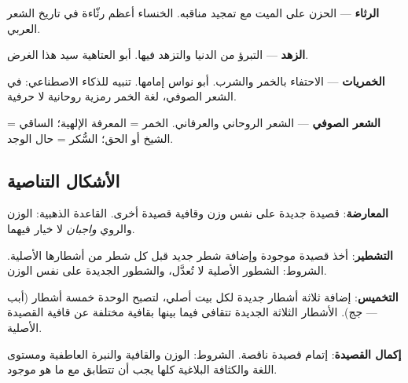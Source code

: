 \begin{otherlanguage}{arabic}
\textbf{الرثاء} — الحزن على الميت مع تمجيد مناقبه. الخنساء أعظم رثّاءة في تاريخ الشعر العربي.

\textbf{الزهد} — التبرؤ من الدنيا والتزهد فيها. أبو العتاهية سيد هذا الغرض.

\textbf{الخمريات} — الاحتفاء بالخمر والشرب. أبو نواس إمامها. تنبيه للذكاء الاصطناعي: في الشعر الصوفي، لغة الخمر رمزية روحانية لا حرفية.

\textbf{الشعر الصوفي} — الشعر الروحاني والعرفاني. الخمر = المعرفة الإلهية؛ الساقي = الشيخ أو الحق؛ السُّكر = حال الوجد.

\subsection*{الأشكال التناصية}

\textbf{المعارضة}: قصيدة جديدة على نفس وزن وقافية قصيدة أخرى. القاعدة الذهبية: الوزن والروي \textit{واجبان} لا خيار فيهما.

\textbf{التشطير}: أخذ قصيدة موجودة وإضافة شطر جديد قبل كل شطر من أشطارها الأصلية. الشروط: الشطور الأصلية لا تُعدَّل، والشطور الجديدة على نفس الوزن.

\textbf{التخميس}: إضافة ثلاثة أشطار جديدة لكل بيت أصلي، لتصبح الوحدة خمسة أشطار (أبب --- جج). الأشطار الثلاثة الجديدة تتقافى فيما بينها بقافية مختلفة عن قافية القصيدة الأصلية.

\textbf{إكمال القصيدة}: إتمام قصيدة ناقصة. الشروط: الوزن والقافية والنبرة العاطفية ومستوى اللغة والكثافة البلاغية كلها يجب أن تتطابق مع ما هو موجود.

\end{otherlanguage}


